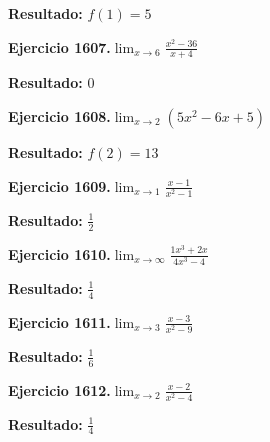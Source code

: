 \documentclass[10pt,a4paper]{article}
\begin{document}
\begin{solbox}
\textbf{Resultado:} \(\displaystyle f(1) = 5\)
\end{solbox}

\begin{ejbox}
\textbf{Ejercicio 1607.}\quad $\lim_{x\to 6} \frac{x^2-36}{x+4}$
\end{ejbox}

\begin{solbox}
\textbf{Resultado:} \(\displaystyle 0\)
\end{solbox}

\begin{ejbox}
\textbf{Ejercicio 1608.}\quad $\lim_{x\to 2} (5x^2 -6x +5)$
\end{ejbox}

\begin{solbox}
\textbf{Resultado:} \(\displaystyle f(2) = 13\)
\end{solbox}

\newpage
\begin{ejbox}
\textbf{Ejercicio 1609.}\quad $\lim_{x\to 1} \frac{x-1}{x^2-1}$
\end{ejbox}

\begin{solbox}
\textbf{Resultado:} \(\displaystyle \frac{1}{2}\)
\end{solbox}

\begin{ejbox}
\textbf{Ejercicio 1610.}\quad $\lim_{x\to \infty} \frac{1x^3 + 2x}{4x^3 - 4}$
\end{ejbox}

\begin{solbox}
\textbf{Resultado:} \(\displaystyle \frac{1}{4}\)
\end{solbox}

\begin{ejbox}
\textbf{Ejercicio 1611.}\quad $\lim_{x\to 3} \frac{x-3}{x^2-9}$
\end{ejbox}

\begin{solbox}
\textbf{Resultado:} \(\displaystyle \frac{1}{6}\)
\end{solbox}

\newpage
\begin{ejbox}
\textbf{Ejercicio 1612.}\quad $\lim_{x\to 2} \frac{x-2}{x^2-4}$
\end{ejbox}

\begin{solbox}
\textbf{Resultado:} \(\displaystyle \frac{1}{4}\)
\end{solbox}
\end{document}
